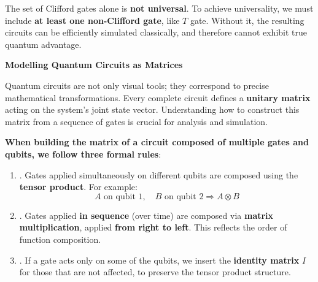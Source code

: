\noindent
The set of Clifford gates alone is \textbf{not universal}. To achieve universality, we must include \textbf{at least one non-Clifford gate}, like $T$ gate. Without it, the resulting circuits can be efficiently simulated classically, and therefore cannot exhibit true quantum advantage.

\newpage

\begin{flushleft}
    \textcolor{Green3}{ \textbf{Modelling Quantum Circuits as Matrices}}
\end{flushleft}
Quantum circuits are not only visual tools; they correspond to precise mathematical transformations. Every complete circuit defines a \textbf{unitary matrix} acting on the system's joint state vector. Understanding how to construct this matrix from a sequence of gates is crucial for analysis and simulation.

\highspace
\textbf{When building the matrix of a circuit composed of multiple gates and qubits, we follow three formal rules}:
\begin{enumerate}
    \item {}. Gates applied simultaneously on different qubits are composed using the \textbf{tensor product}. For example:
    \begin{equation*}
        A \text{ on qubit 1}, \quad B \text{ on qubit 2} \Rightarrow A \otimes B
    \end{equation*}
    
    \item {}. Gates applied \textbf{in sequence} (over time) are composed via \textbf{matrix multiplication}, applied \textbf{from right to left}. This reflects the order of function composition.
    
    \item {}. If a gate acts only on some of the qubits, we insert the \textbf{identity matrix} $I$ for those that are not affected, to preserve the tensor product structure.
\end{enumerate}